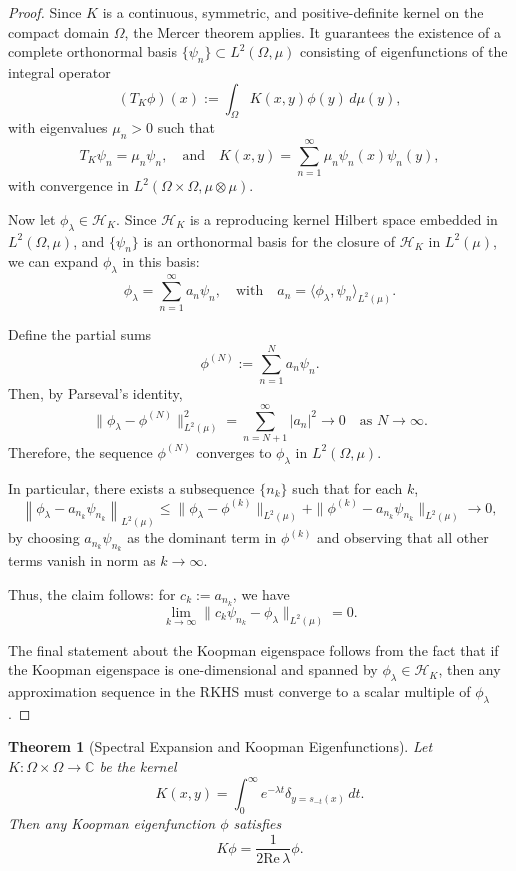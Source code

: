 \documentclass[11pt]{article}
\theoremstyle{plain}
\newtheorem{theorem}{Theorem}[section]
\def\[{\begin{equation}}
\def\]{\end{equation}}
\begin{document}
\begin{proof}
Since $K$ is a continuous, symmetric, and positive-definite kernel on the compact domain $\Omega$, the Mercer theorem applies. It guarantees the existence of a complete orthonormal basis $\{\psi_n\} \subset L^2(\Omega, \mu)$ consisting of eigenfunctions of the integral operator
\[
(T_K \phi)(x) := \int_\Omega K(x, y) \phi(y) \, d\mu(y),
\]
with eigenvalues $\mu_n > 0$ such that
\[
T_K \psi_n = \mu_n \psi_n, \quad \text{and} \quad K(x, y) = \sum_{n=1}^\infty \mu_n \psi_n(x) \psi_n(y),
\]
with convergence in $L^2(\Omega \times \Omega, \mu \otimes \mu)$.

Now let $\phi_\lambda \in \mathcal{H}_K$. Since $\mathcal{H}_K$ is a reproducing kernel Hilbert space embedded in $L^2(\Omega, \mu)$, and $\{\psi_n\}$ is an orthonormal basis for the closure of $\mathcal{H}_K$ in $L^2(\mu)$, we can expand $\phi_\lambda$ in this basis:
\[
\phi_\lambda = \sum_{n=1}^\infty a_n \psi_n, \quad \text{with} \quad a_n = \langle \phi_\lambda, \psi_n \rangle_{L^2(\mu)}.
\]

Define the partial sums
\[
\phi^{(N)} := \sum_{n=1}^N a_n \psi_n.
\]
Then, by Parseval’s identity,
\[
\| \phi_\lambda - \phi^{(N)} \|_{L^2(\mu)}^2 = \sum_{n=N+1}^\infty |a_n|^2 \to 0 \quad \text{as } N \to \infty.
\]
Therefore, the sequence $\phi^{(N)}$ converges to $\phi_\lambda$ in $L^2(\Omega, \mu)$.

In particular, there exists a subsequence $\{n_k\}$ such that for each $k$,
\[
\left\| \phi_\lambda - a_{n_k} \psi_{n_k} \right\|_{L^2(\mu)} \leq \| \phi_\lambda - \phi^{(k)} \|_{L^2(\mu)} + \| \phi^{(k)} - a_{n_k} \psi_{n_k} \|_{L^2(\mu)} \to 0,
\]
by choosing $a_{n_k} \psi_{n_k}$ as the dominant term in $\phi^{(k)}$ and observing that all other terms vanish in norm as $k \to \infty$.

Thus, the claim follows: for $c_k := a_{n_k}$, we have
\[
\lim_{k \to \infty} \| c_k \psi_{n_k} - \phi_\lambda \|_{L^2(\mu)} = 0.
\]

The final statement about the Koopman eigenspace follows from the fact that if the Koopman eigenspace is one-dimensional and spanned by $\phi_\lambda \in \mathcal{H}_K$, then any approximation sequence in the RKHS must converge to a scalar multiple of $\phi_\lambda$.
\end{proof}

\begin{theorem}[Spectral Expansion and Koopman Eigenfunctions]
\label{thm:SpectralExpansion}
Let $K:\Omega \times\Omega \to\mathbb{C}$ be the kernel
\[
K(x,y) = \int_0^\infty e^{-\lambda t} \delta_{y=s_{-t}(x)}\,dt.
\]
Then any Koopman eigenfunction $\phi$ satisfies
\[
K\phi = \frac{1}{2\mathrm{Re}\,\lambda}\phi.
\]
\end{theorem}
\end{document}
